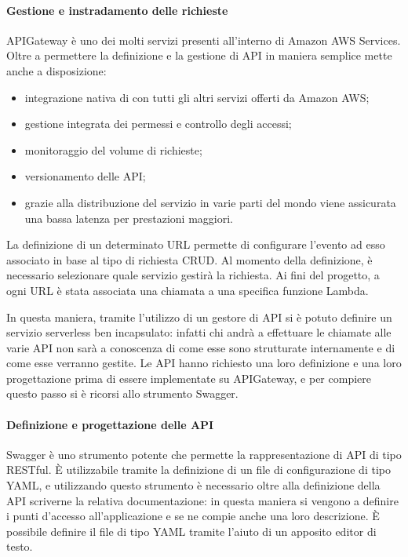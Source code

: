 \paragraph*{Gestione e instradamento delle richieste}
APIGateway è uno dei molti servizi presenti all'interno di Amazon AWS Services.
Oltre a permettere la definizione e la gestione di API in maniera
semplice mette anche a disposizione:
\begin{itemize}
  \item integrazione nativa di con tutti gli altri servizi offerti da Amazon
AWS;
  \item gestione integrata dei permessi e controllo degli accessi;
  \item monitoraggio del volume di richieste;
  \item versionamento delle API;
  \item grazie alla distribuzione del servizio in varie parti del mondo viene
assicurata una bassa latenza per prestazioni maggiori.
\end{itemize}
La definizione di un determinato URL permette di configurare l'evento ad esso
associato in base al tipo di richiesta CRUD. Al momento della definizione, è
necessario selezionare quale servizio gestirà la richiesta. Ai fini del
progetto, a ogni URL è stata associata una chiamata a una specifica funzione
Lambda.

In questa maniera, tramite l'utilizzo di un gestore di API si è potuto definire
un servizio serverless ben incapsulato: infatti chi andrà a effettuare le
chiamate alle varie API non sarà a conoscenza di come esse sono strutturate
internamente e di come esse verranno gestite.
Le API hanno richiesto una loro definizione e una loro progettazione prima di
essere implementate su APIGateway, e per compiere questo passo si è ricorsi
allo strumento Swagger.


\paragraph*{Definizione e progettazione delle API}
Swagger è uno strumento potente che permette la rappresentazione di API di
tipo RESTful. È utilizzabile tramite la definizione di un file di
configurazione di tipo YAML, e utilizzando questo strumento è necessario oltre
alla definizione della API scriverne la relativa documentazione: in  questa
maniera si vengono a definire i punti d'accesso all'applicazione e se ne compie
anche una loro descrizione. È possibile definire il file di tipo YAML tramite
l'aiuto di un apposito editor di testo.

